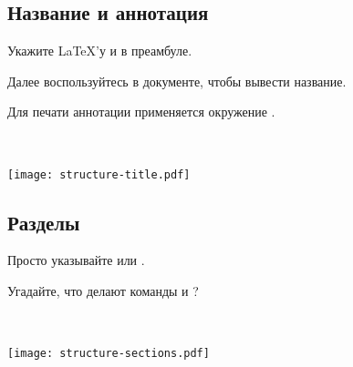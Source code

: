 \documentclass{beamer}
\begin{document}
\subsection{Название и аннотация}
\begin{frame}[fragile]{\insertsubsection}
\vspace{-2ex}
\begin{itemize}{\small
\item Укажите \LaTeX{}'у  и  в преамбуле.
\item Далее воспользуйтесь  в документе, чтобы вывести название.
\item Для печати аннотации применяется окружение .
}\end{itemize}
\vspace{-2ex}
\begin{minipage}{0.55\linewidth}
\end{minipage}~~%
\begin{minipage}{0.45\linewidth}
\texttt{[image: structure-title.pdf]}
\end{minipage}
\end{frame}

\subsection{Разделы}
\begin{frame}{\insertsubsection}
\vspace{-2ex}
\begin{itemize}{\small
\item Просто указывайте  или .
\item Угадайте, что делают команды  и ?
}\end{itemize}
\begin{minipage}{0.55\linewidth}
\end{minipage}~~%
\begin{minipage}{0.45\linewidth}
\texttt{[image: structure-sections.pdf]}
\end{minipage}
\end{frame}
\end{document}

